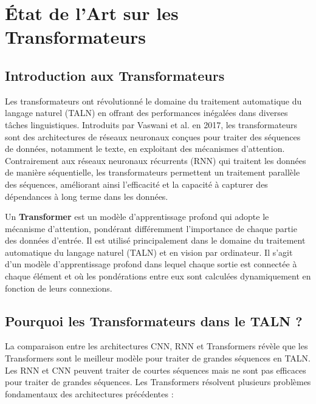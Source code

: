 \section{État de l'Art sur les Transformateurs}

\subsection{Introduction aux Transformateurs}

Les transformateurs ont révolutionné le domaine du traitement automatique du langage naturel (TALN) en offrant des performances inégalées dans diverses tâches linguistiques. Introduits par Vaswani et al. \cite{vaswani2017attention} en 2017, les transformateurs sont des architectures de réseaux neuronaux conçues pour traiter des séquences de données, notamment le texte, en exploitant des mécanismes d'attention. Contrairement aux réseaux neuronaux récurrents (RNN) qui traitent les données de manière séquentielle, les transformateurs permettent un traitement parallèle des séquences, améliorant ainsi l'efficacité et la capacité à capturer des dépendances à long terme dans les données.

Un \textbf{Transformer} est un modèle d'apprentissage profond qui adopte le mécanisme d'attention, pondérant différemment l'importance de chaque partie des données d'entrée. Il est utilisé principalement dans le domaine du traitement automatique du langage naturel (TALN) et en vision par ordinateur. Il s'agit d'un modèle d'apprentissage profond dans lequel chaque sortie est connectée à chaque élément et où les pondérations entre eux sont calculées dynamiquement en fonction de leurs connexions.

\subsection{Pourquoi les Transformateurs dans le TALN ?}

La comparaison entre les architectures CNN, RNN et Transformers révèle que les Transformers sont le meilleur modèle pour traiter de grandes séquences en TALN. Les RNN et CNN peuvent traiter de courtes séquences mais ne sont pas efficaces pour traiter de grandes séquences. Les Transformers résolvent plusieurs problèmes fondamentaux des architectures précédentes :

